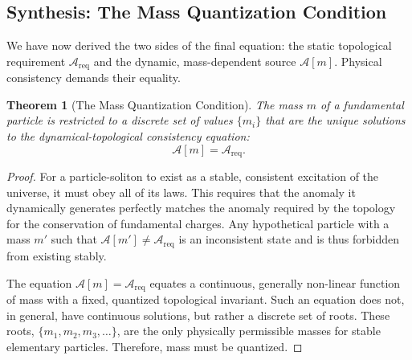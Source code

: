 \documentclass[11pt, letterpaper]{report}
\theoremstyle{plain} %
\newtheorem{theorem}{Theorem}[chapter]
\theoremstyle{definition} %
\theoremstyle{remark} %
\begin{document}
\subsection{Synthesis: The Mass Quantization Condition}
\label{subsec:quantization_synthesis}

We have now derived the two sides of the final equation: the static topological requirement $\mathcal{A}_{\text{req}}$ and the dynamic, mass-dependent source $\mathcal{A}[m]$. Physical consistency demands their equality.

\begin{theorem}[The Mass Quantization Condition]
\label{thm:mass_quantization_equation_final}
The mass $m$ of a fundamental particle is restricted to a discrete set of values $\{m_i\}$ that are the unique solutions to the dynamical-topological consistency equation:
\begin{equation}
    \mathcal{A}[m] = \mathcal{A}_{\text{req}}.
    \label{eq:mass_quantization_equation_final_final}
\end{equation}
\end{theorem}
\begin{proof}
For a particle-soliton to exist as a stable, consistent excitation of the universe, it must obey all of its laws. This requires that the anomaly it dynamically generates perfectly matches the anomaly required by the topology for the conservation of fundamental charges. Any hypothetical particle with a mass $m'$ such that $\mathcal{A}[m'] \neq \mathcal{A}_{\text{req}}$ is an inconsistent state and is thus forbidden from existing stably.

The equation $\mathcal{A}[m] = \mathcal{A}_{\text{req}}$ equates a continuous, generally non-linear function of mass with a fixed, quantized topological invariant. Such an equation does not, in general, have continuous solutions, but rather a discrete set of roots. These roots, $\{m_1, m_2, m_3, \dots\}$, are the only physically permissible masses for stable elementary particles. Therefore, mass must be quantized.
\end{proof}
\end{document}
